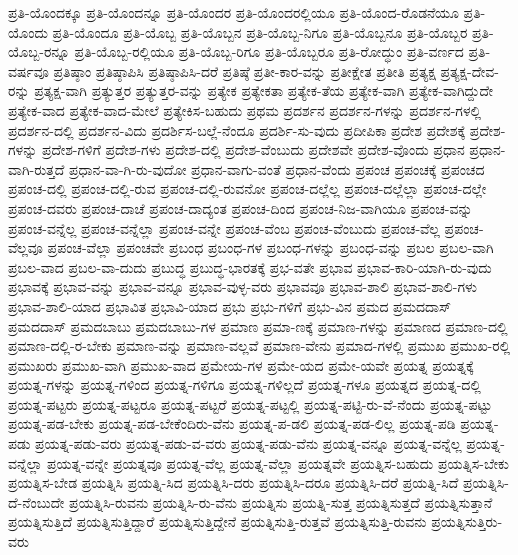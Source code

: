 {ಪ್ರತಿ-ಯೊಂದಕ್ಕೂ
ಪ್ರತಿ-ಯೊಂದನ್ನೂ
ಪ್ರತಿ-ಯೊಂದರ
ಪ್ರತಿ-ಯೊಂದರಲ್ಲಿಯೂ
ಪ್ರತಿ-ಯೊಂದ-ರೊಡನೆಯೂ
ಪ್ರತಿ-ಯೊಂದು
ಪ್ರತಿ-ಯೊಂದೂ
ಪ್ರತಿ-ಯೊಬ್ಬ
ಪ್ರತಿ-ಯೊಬ್ಬನ
ಪ್ರತಿ-ಯೊಬ್ಬ-ನಿಗೂ
ಪ್ರತಿ-ಯೊಬ್ಬನೂ
ಪ್ರತಿ-ಯೊಬ್ಬರ
ಪ್ರತಿ-ಯೊಬ್ಬ-ರನ್ನೂ
ಪ್ರತಿ-ಯೊಬ್ಬ-ರಲ್ಲಿಯೂ
ಪ್ರತಿ-ಯೊಬ್ಬ-ರಿಗೂ
ಪ್ರತಿ-ಯೊಬ್ಬರೂ
ಪ್ರತಿ-ರೋದ್ಧುಂ
ಪ್ರತಿ-ವರ್ಣದ
ಪ್ರತಿ-ವರ್ಷವೂ
ಪ್ರತಿಷ್ಠಾಂ
ಪ್ರತಿಷ್ಠಾಪಿಸಿ
ಪ್ರತಿಷ್ಠಾಪಿಸಿ-ದರೆ
ಪ್ರತಿಷ್ಠೆ
ಪ್ರತೀ-ಕಾರ-ವನ್ನು
ಪ್ರತೀಕ್ಷೇತ
ಪ್ರತೀತಿ
ಪ್ರತ್ಯಕ್ಷ
ಪ್ರತ್ಯಕ್ಷ-ದೇವ-ರನ್ನು
ಪ್ರತ್ಯಕ್ಷ-ವಾಗಿ
ಪ್ರತ್ಯುತ್ತರ
ಪ್ರತ್ಯುತ್ತರ-ವನ್ನು
ಪ್ರತ್ಯೇಕ
ಪ್ರತ್ಯೇಕತಾ
ಪ್ರತ್ಯೇಕ-ತೆಯ
ಪ್ರತ್ಯೇಕ-ವಾಗಿ
ಪ್ರತ್ಯೇಕ-ವಾಗಿದ್ದುದೇ
ಪ್ರತ್ಯೇಕ-ವಾದ
ಪ್ರತ್ಯೇಕ-ವಾದ-ಮೇಲೆ
ಪ್ರತ್ಯೇಕಿಸ-ಬಹುದು
ಪ್ರಥಮ
ಪ್ರದರ್ಶನ
ಪ್ರದರ್ಶನ-ಗಳನ್ನು
ಪ್ರದರ್ಶನ-ಗಳಲ್ಲಿ
ಪ್ರದರ್ಶನ-ದಲ್ಲಿ
ಪ್ರದರ್ಶನ-ವಿದು
ಪ್ರದರ್ಶಿಸ-ಬಲ್ಲೆ-ನೆಂದೂ
ಪ್ರದರ್ಶಿ-ಸು-ವುದು
ಪ್ರದೀಪಿಕಾ
ಪ್ರದೇಶ
ಪ್ರದೇಶಕ್ಕೆ
ಪ್ರದೇಶ-ಗಳನ್ನು
ಪ್ರದೇಶ-ಗಳಿಗೆ
ಪ್ರದೇಶ-ಗಳು
ಪ್ರದೇಶ-ದಲ್ಲಿ
ಪ್ರದೇಶ-ವೆಂಬುದು
ಪ್ರದೇಶವೇ
ಪ್ರದೇಶ-ವೊಂದು
ಪ್ರಧಾನ
ಪ್ರಧಾನ-ವಾಗಿ-ರುತ್ತದೆ
ಪ್ರಧಾನ-ವಾ-ಗಿ-ರು-ವುದೋ
ಪ್ರಧಾನ-ವಾಗು-ವಂತೆ
ಪ್ರಧಾನ-ವೆಂದು
ಪ್ರಪಂಚ
ಪ್ರಪಂಚಕ್ಕೆ
ಪ್ರಪಂಚದ
ಪ್ರಪಂಚ-ದಲ್ಲಿ
ಪ್ರಪಂಚ-ದಲ್ಲಿ-ರುವ
ಪ್ರಪಂಚ-ದಲ್ಲಿ-ರುವನೋ
ಪ್ರಪಂಚ-ದಲ್ಲೆಲ್ಲ
ಪ್ರಪಂಚ-ದಲ್ಲೆಲ್ಲಾ
ಪ್ರಪಂಚ-ದಲ್ಲೇ
ಪ್ರಪಂಚ-ದವರು
ಪ್ರಪಂಚ-ದಾಚೆ
ಪ್ರಪಂಚ-ದಾದ್ಯಂತ
ಪ್ರಪಂಚ-ದಿಂದ
ಪ್ರಪಂಚ-ನಿಜ-ವಾಗಿಯೂ
ಪ್ರಪಂಚ-ವನ್ನು
ಪ್ರಪಂಚ-ವನ್ನೆಲ್ಲ
ಪ್ರಪಂಚ-ವನ್ನೆಲ್ಲಾ
ಪ್ರಪಂಚ-ವನ್ನೇ
ಪ್ರಪಂಚ-ವೆಂಬ
ಪ್ರಪಂಚ-ವೆಂಬುದು
ಪ್ರಪಂಚ-ವೆಲ್ಲ
ಪ್ರಪಂಚ-ವೆಲ್ಲವೂ
ಪ್ರಪಂಚ-ವೆಲ್ಲಾ
ಪ್ರಪಂಚವೇ
ಪ್ರಬಂಧ
ಪ್ರಬಂಧ-ಗಳ
ಪ್ರಬಂಧ-ಗಳನ್ನು
ಪ್ರಬಂಧ-ವನ್ನು
ಪ್ರಬಲ
ಪ್ರಬಲ-ವಾಗಿ
ಪ್ರಬಲ-ವಾದ
ಪ್ರಬಲ-ವಾ-ದುದು
ಪ್ರಬುದ್ಧ
ಪ್ರಬುದ್ಧ-ಭಾರತಕ್ಕೆ
ಪ್ರಭ-ವತೇ
ಪ್ರಭಾವ
ಪ್ರಭಾವ-ಕಾರಿ-ಯಾಗಿ-ರು-ವುದು
ಪ್ರಭಾವಕ್ಕೆ
ಪ್ರಭಾವ-ವನ್ನು
ಪ್ರಭಾವ-ವನ್ನೂ
ಪ್ರಭಾವ-ವುಳ್ಳ-ವರು
ಪ್ರಭಾವವೂ
ಪ್ರಭಾವ-ಶಾಲಿ
ಪ್ರಭಾವ-ಶಾಲಿ-ಗಳು
ಪ್ರಭಾವ-ಶಾಲಿ-ಯಾದ
ಪ್ರಭಾವಿತ
ಪ್ರಭಾವಿ-ಯಾದ
ಪ್ರಭು
ಪ್ರಭು-ಗಳಿಗೆ
ಪ್ರಭು-ವಿನ
ಪ್ರಮದ
ಪ್ರಮದದಾಸ್
ಪ್ರಮದದಾಸ್‌
ಪ್ರಮದಬಾಬು
ಪ್ರಮದಬಾಬು-ಗಳ
ಪ್ರಮಾಣ
ಪ್ರಮಾ-ಣಕ್ಕೆ
ಪ್ರಮಾಣ-ಗಳನ್ನು
ಪ್ರಮಾಣದ
ಪ್ರಮಾಣ-ದಲ್ಲಿ
ಪ್ರಮಾಣ-ದಲ್ಲಿ-ರ-ಬೇಕು
ಪ್ರಮಾಣ-ವನ್ನು
ಪ್ರಮಾಣ-ವಲ್ಲವೆ
ಪ್ರಮಾಣ-ವೇನು
ಪ್ರಮಾದ-ಗಳಲ್ಲಿ
ಪ್ರಮುಖ
ಪ್ರಮುಖ-ರಲ್ಲಿ
ಪ್ರಮುಖರು
ಪ್ರಮುಖ-ವಾಗಿ
ಪ್ರಮುಖ-ವಾದ
ಪ್ರಮೇಯ-ಗಳ
ಪ್ರಮೇ-ಯದ
ಪ್ರಮೇ-ಯವೇ
ಪ್ರಯತ್ನ
ಪ್ರಯತ್ನಕ್ಕೆ
ಪ್ರಯತ್ನ-ಗಳನ್ನು
ಪ್ರಯತ್ನ-ಗಳಿಂದ
ಪ್ರಯತ್ನ-ಗಳಿಗೂ
ಪ್ರಯತ್ನ-ಗಳಿಲ್ಲದೆ
ಪ್ರಯತ್ನ-ಗಳೂ
ಪ್ರಯತ್ನದ
ಪ್ರಯತ್ನ-ದಲ್ಲಿ
ಪ್ರಯತ್ನ-ಪಟ್ಟರು
ಪ್ರಯತ್ನ-ಪಟ್ಟರೂ
ಪ್ರಯತ್ನ-ಪಟ್ಟರೆ
ಪ್ರಯತ್ನ-ಪಟ್ಟಲ್ಲಿ
ಪ್ರಯತ್ನ-ಪಟ್ಟಿ-ರು-ವೆ-ನೆಂದು
ಪ್ರಯತ್ನ-ಪಟ್ಟು
ಪ್ರಯತ್ನ-ಪಡ-ಬೇಕು
ಪ್ರಯತ್ನ-ಪಡ-ಬೇಕೆಂದಿರು-ವೆನು
ಪ್ರಯತ್ನ-ಪ-ಡಲಿ
ಪ್ರಯತ್ನ-ಪಡ-ಲಿಲ್ಲ
ಪ್ರಯತ್ನ-ಪಡಿ
ಪ್ರಯತ್ನ-ಪಡು
ಪ್ರಯತ್ನ-ಪಡು-ವರು
ಪ್ರಯತ್ನ-ಪಡು-ವ-ವರು
ಪ್ರಯತ್ನ-ಪಡು-ವೆನು
ಪ್ರಯತ್ನ-ವನ್ನೂ
ಪ್ರಯತ್ನ-ವನ್ನೆಲ್ಲ
ಪ್ರಯತ್ನ-ವನ್ನೆಲ್ಲಾ
ಪ್ರಯತ್ನ-ವನ್ನೇ
ಪ್ರಯತ್ನವೂ
ಪ್ರಯತ್ನ-ವೆಲ್ಲ
ಪ್ರಯತ್ನ-ವೆಲ್ಲಾ
ಪ್ರಯತ್ನವೇ
ಪ್ರಯತ್ನಿಸ-ಬಹುದು
ಪ್ರಯತ್ನಿಸ-ಬೇಕು
ಪ್ರಯತ್ನಿಸ-ಬೇಡ
ಪ್ರಯತ್ನಿಸಿ
ಪ್ರಯತ್ನಿ-ಸಿದ
ಪ್ರಯತ್ನಿಸಿ-ದರು
ಪ್ರಯತ್ನಿಸಿ-ದರೂ
ಪ್ರಯತ್ನಿಸಿ-ದರೆ
ಪ್ರಯತ್ನಿ-ಸಿದೆ
ಪ್ರಯತ್ನಿಸಿ-ದೆ-ನೆಂಬುದೇ
ಪ್ರಯತ್ನಿಸಿ-ರುವನು
ಪ್ರಯತ್ನಿಸಿ-ರು-ವೆನು
ಪ್ರಯತ್ನಿಸು
ಪ್ರಯತ್ನಿ-ಸುತ್ತ
ಪ್ರಯತ್ನಿಸುತ್ತದೆ
ಪ್ರಯತ್ನಿಸುತ್ತಾನೆ
ಪ್ರಯತ್ನಿಸುತ್ತಿದೆ
ಪ್ರಯತ್ನಿಸುತ್ತಿದ್ದಾರೆ
ಪ್ರಯತ್ನಿಸುತ್ತಿದ್ದೇನೆ
ಪ್ರಯತ್ನಿಸುತ್ತಿ-ರುತ್ತವೆ
ಪ್ರಯತ್ನಿಸುತ್ತಿ-ರುವನು
ಪ್ರಯತ್ನಿಸುತ್ತಿರು-ವರು
}
